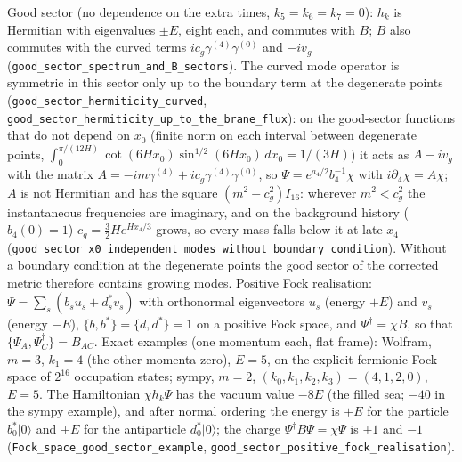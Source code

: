 \documentclass[11pt]{article}
\begin{document}
Good sector (no dependence on the extra times, $k_5 = k_6 = k_7 = 0$): $h_k$ is Hermitian with eigenvalues $\pm E$, eight each, and commutes with $B$; $B$ also commutes with the curved terms $ic_g\gamma^{(4)}\gamma^{(0)}$ and $-iv_g$ (\texttt{good\_sec\allowbreak{}tor\_spec\allowbreak{}trum\_and\allowbreak{}\_B\_secto\allowbreak{}rs}). The curved mode operator is symmetric in this sector only up to the boundary term at the degenerate points (\texttt{good\_sec\allowbreak{}tor\_herm\allowbreak{}iticity\_\allowbreak{}curved}, \texttt{good\_sec\allowbreak{}tor\_herm\allowbreak{}iticity\_\allowbreak{}up\_to\_th\allowbreak{}e\_brane\_\allowbreak{}flux}): on the good-sector functions that do not depend on $x_0$ (finite norm on each interval between degenerate points, $\int_0^{\pi/(12H)}\cot(6Hx_0)\sin^{1/2}(6Hx_0)\,dx_0 = 1/(3H)$) it acts as $A - iv_g$ with the matrix $A = -im\gamma^{(4)} + ic_g\gamma^{(4)}\gamma^{(0)}$, so $\Psi = e^{a_4/2}b_4^{-1}\chi$ with $i\partial_4\chi = A\chi$; $A$ is not Hermitian and has the square $(m^2 - c_g^2)I_{16}$: wherever $m^2 < c_g^2$ the instantaneous frequencies are imaginary, and on the background history ($b_4(0) = 1$) $c_g = \tfrac32He^{Hx_4/3}$ grows, so every mass falls below it at late $x_4$ (\texttt{good\_sec\allowbreak{}tor\_x0\_i\allowbreak{}ndepende\allowbreak{}nt\_modes\allowbreak{}\_without\allowbreak{}\_boundar\allowbreak{}y\_condit\allowbreak{}ion}). Without a boundary condition at the degenerate points the good sector of the corrected metric therefore contains growing modes. Positive Fock realisation: $\Psi = \sum_s(b_s u_s + d_s^* v_s)$ with orthonormal eigenvectors $u_s$ (energy $+E$) and $v_s$ (energy $-E$), $\{b, b^*\} = \{d, d^*\} = 1$ on a positive Fock space, and $\Psi^\dagger = \chi B$, so that $\{\Psi_A, \Psi^\dagger_C\} = B_{AC}$. Exact examples (one momentum each, flat frame): Wolfram, $m = 3$, $k_1 = 4$ (the other momenta zero), $E = 5$, on the explicit fermionic Fock space of $2^{16}$ occupation states; sympy, $m = 2$, $(k_0, k_1, k_2, k_3) = (4, 1, 2, 0)$, $E = 5$. The Hamiltonian $\chi h_k\Psi$ has the vacuum value $-8E$ (the filled sea; $-40$ in the sympy example), and after normal ordering the energy is $+E$ for the particle $b_0^*|0\rangle$ and $+E$ for the antiparticle $d_0^*|0\rangle$; the charge $\Psi^\dagger B\Psi = \chi\Psi$ is $+1$ and $-1$ (\texttt{Fock\_spa\allowbreak{}ce\_good\_\allowbreak{}sector\_e\allowbreak{}xample}, \texttt{good\_sec\allowbreak{}tor\_posi\allowbreak{}tive\_foc\allowbreak{}k\_realis\allowbreak{}ation}).
\end{document}
